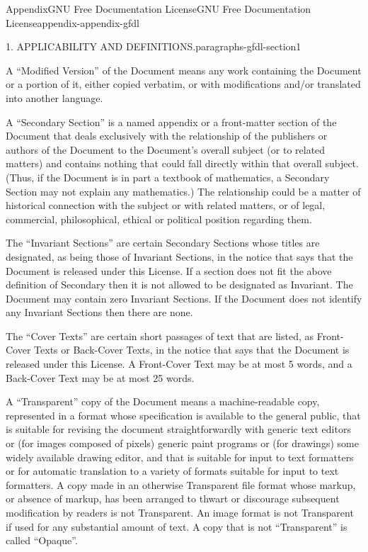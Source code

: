 \documentclass[twoside,10pt,]{book}
\numberwithin{equation}{part}
\begin{document}
\begin{appendixptx}{Appendix}{GNU Free Documentation License}{}{GNU Free Documentation License}{}{}{appendix-appendix-gfdl}
\begin{paragraphs}{1. APPLICABILITY AND DEFINITIONS.}{paragraphs-gfdl-section1}
\par
A ``Modified Version'' of the Document means any work containing the Document or a portion of it, either copied verbatim, or with modifications and\slash{}or translated into another language.%
\par
A ``Secondary Section'' is a named appendix or a front-matter section of the Document that deals exclusively with the relationship of the publishers or authors of the Document to the Document's overall subject (or to related matters) and contains nothing that could fall directly within that overall subject. (Thus, if the Document is in part a textbook of mathematics, a Secondary Section may not explain any mathematics.) The relationship could be a matter of historical connection with the subject or with related matters, or of legal, commercial, philosophical, ethical or political position regarding them.%
\par
The ``Invariant Sections'' are certain Secondary Sections whose titles are designated, as being those of Invariant Sections, in the notice that says that the Document is released under this License. If a section does not fit the above definition of Secondary then it is not allowed to be designated as Invariant. The Document may contain zero Invariant Sections. If the Document does not identify any Invariant Sections then there are none.%
\par
The ``Cover Texts'' are certain short passages of text that are listed, as Front-Cover Texts or Back-Cover Texts, in the notice that says that the Document is released under this License. A Front-Cover Text may be at most 5 words, and a Back-Cover Text may be at most 25 words.%
\par
A ``Transparent'' copy of the Document means a machine-readable copy, represented in a format whose specification is available to the general public, that is suitable for revising the document straightforwardly with generic text editors or (for images composed of pixels) generic paint programs or (for drawings) some widely available drawing editor, and that is suitable for input to text formatters or for automatic translation to a variety of formats suitable for input to text formatters. A copy made in an otherwise Transparent file format whose markup, or absence of markup, has been arranged to thwart or discourage subsequent modification by readers is not Transparent. An image format is not Transparent if used for any substantial amount of text. A copy that is not ``Transparent'' is called ``Opaque''.%
\par

\end{paragraphs}
\end{appendixptx}
\end{document}
